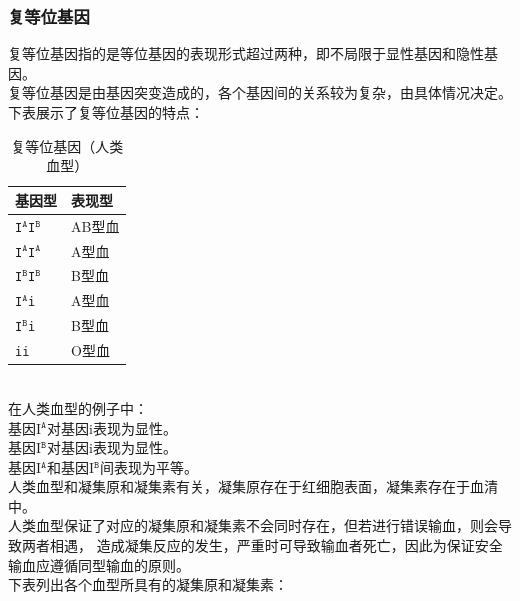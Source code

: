 \documentclass[UTF8]{ctexart}
\begin{document}
\subsubsection{复等位基因}
    复等位基因指的是等位基因的表现形式超过两种，即不局限于显性基因和隐性基因。\\[3mm]
    复等位基因是由基因突变造成的，各个基因间的关系较为复杂，由具体情况决定。\\[3mm]
    下表展示了复等位基因的特点：
    \begin{table}[h]
        \begin{center}
            \begin{tabular}{l|l}
                \hline
                基因型\qquad\qquad\qquad&表现型\qquad\qquad\qquad\\ \hline
                \texttt{I$^{\texttt{A}}$I$^{\texttt{B}}$}&AB型血\\ \hline
                \texttt{I$^{\texttt{A}}$I$^{\texttt{A}}$}&A型血\\ \hline
                \texttt{I$^{\texttt{B}}$I$^{\texttt{B}}$}&B型血\\ \hline
                \texttt{I$^{\texttt{A}}$i}&A型血\\ \hline
                \texttt{I$^{\texttt{B}}$i}&B型血\\ \hline
                \texttt{ii}&O型血\\ \hline
            \end{tabular}
            \caption{复等位基因（人类血型）}
        \end{center}
    \end{table}\\
    在人类血型的例子中：\\[3mm]
    基因I$^{\texttt{A}}$对基因i表现为显性。\\[3mm]
    基因I$^{\texttt{B}}$对基因i表现为显性。\\[3mm]
    基因I$^{\texttt{A}}$和基因I$^{\texttt{B}}$间表现为平等。\\[6mm]
    人类血型和凝集原和凝集素有关，凝集原存在于红细胞表面，凝集素存在于血清中。\\[3mm]
    人类血型保证了对应的凝集原和凝集素不会同时存在，但若进行错误输血，则会导致两者相遇，
    造成凝集反应的发生，严重时可导致输血者死亡，因此为保证安全输血应遵循同型输血的原则。\\[3mm]
    下表列出各个血型所具有的凝集原和凝集素：\vspace{3pt}
\end{document}
